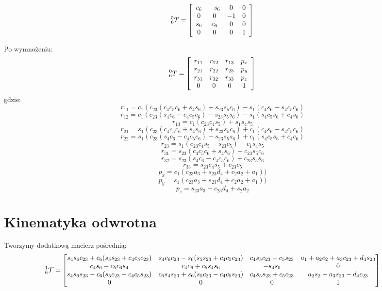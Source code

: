 \documentclass[]{article}
\newcommand\T{\mathcal{T}}
\begin{document}
\[\prescript{5}{6}{T}=\begin{bmatrix}
\begin{array}{cccc}
c_6 & -s_6 & 0 & 0 \\
0 & 0 & -1 & 0 \\
s_6 & c_6 & 0 & 0 \\
0 & 0 & 0 & 1 \\
\end{array}
\end{bmatrix}
\]

Po wymnożeniu:
\[\prescript{0}{6}{T}=\begin{bmatrix}
\begin{array}{cccc}
r_{11} & r_{12} & r_{13} & p_x \\
r_{21} & r_{22} & r_{23} & p_y \\
r_{31} & r_{32} & r_{33} & p_z \\
0 & 0 & 0 & 1 \\
\end{array}
\end{bmatrix}
\]
gdzie:
\[ r_{11} = c_1(c_{23}(c_4c_5c_6 + s_4s_6) + s_{23}s_5c_6) - s_1(c_4s_6 -s_4c_5c_6)\]
\[ r_{12} = c_1(c_{23}(s_4c_6 - c_4c_5c_6) - s_{23}s_5s_6) - s_1(s_4c_5s_6 + c_4s_6)\]
\[ r_{13} = c_1(c_{23}c_4s_5) + s_1s_4s_5\]
\[ r_{21} = s_1(c_{23}(c_4c_5c_6 + s_4s_6) + s_{23}s_5c_6) + c_1(c_4s_6 -s_4c_5c_6 )\]
\[ r_{22} = s_1(c_{23}(s_4c_6 - c_4c_5c_6) - s_{23}s_5s_6) + c_1(s_4c_5s_6 + c_4c_6)\]
\[ r_{23} = s_1(c_{23}c_4s_5 - s_{23}c_5) - c_1s_4s_5\]
\[ r_{31} = s_{23}(c_4c_5c_6 + s_4s_6) - c_{23}s_5c_6\]
\[ r_{32} = s_{23}(s_4c_6 - c_4c_5c_6) + c_{23}s_5s_6\]
\[ r_{33} = s_{23}c_4s_5 + c_{23}c_5\] 
\[ p_x = c_1(c_{23}a_3 + s_{23}d_4 + c_2a_2 + a_1))\] 
\[ p_y = s_1(c_{23}a_3 + s_{23}d_4 + c_2a_2 + a_1))\]
\[ p_z = s_{23}a_3 - c_{23}d_4 + s_2a_2 \]

\section{Kinematyka odwrotna}
Tworzymy dodatkową macierz pośrednią:
\scriptsize
\[\prescript{1}{6}{\T} = \begin{bmatrix}
s_4s_6c_{23} + c_6(s_5s_{23} + c_4c_5c_{23}) &
s_4c_6c_{23} - s_6(s_5s_{23} + c_4c_5c_{23}) &
c_4s_5c_{23} - c_5s_{23} &
a_1 + a_2c_2 + a_3c_{23} + d_4s_{23}
\\
c_4s_6 - c_5c_6s_4 &
c_4c_6 + c_5s_4s_6 &
- s_4s_5 &
0
\\
s_4s_6s_{23} - c_6(s_5c_{23} - c_4c_5s_{23}) &
c_6s_4s_{23} + s_6(s_5c_{23} - c_4c_5s_{23}) &
c_4s_5s_{23} + c_5c_{23} &
a_2s_2 + a_3s_{23} - d_4c_{23}
\\
0 & 0 & 0 & 1
\end{bmatrix}\]
\normalsize
\end{document}
